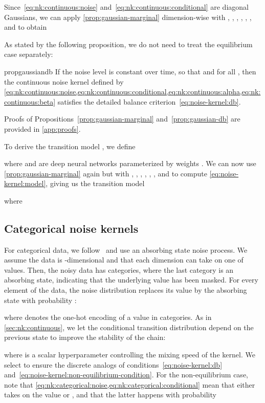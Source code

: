 \documentclass[10pt,twocolumn,letterpaper]{article}
\begin{document}
Since~\eqref{eq:nk:continuous:noise} and~\eqref{eq:nk:continuous:conditional} are diagonal Gaussians, we can apply \cref{prop:gaussian-marginal} dimension-wise with , , , , , , and  to obtain

As stated by the following proposition, we do not need to treat the equilibrium case separately:
\begin{restatable}{prop}{gaussiandb}\label{prop:gaussian-db}
  If the noise level is constant over time, so that  and  for all , then the continuous noise kernel defined by \cref*{eq:nk:continuous:noise,eq:nk:continuous:conditional,eq:nk:continuous:alpha,eq:nk:continuous:beta} satisfies the detailed balance criterion~\eqref{eq:noise-kernel:db}.
\end{restatable}

Proofs of Propositions~\ref{prop:gaussian-marginal} and~\ref{prop:gaussian-db} are provided in \cref{app:proofs}.

To derive the transition model , we define

where  and  are deep neural networks parameterized by weights .
We can now use \cref{prop:gaussian-marginal} again but with , , , , , , and  to compute \cref{eq:noise-kernel:model}, giving us the transition model

where


\subsection{Categorical noise kernels}\label{sec:nk:categorical}

For categorical data, we follow~\cite{austin2021structured} and use an absorbing state noise process.
We assume the data is -dimensional and that each dimension can take on one of  values.
Then, the noisy data has  categories, where the last category is an absorbing state, indicating that the underlying value has been masked.
For every element  of the data, the noise distribution replaces its value  by the absorbing state  with probability :

where  denotes the one-hot encoding of a value  in  categories.
As in \cref{sec:nk:continuous}, we let the conditional transition distribution depend on the previous state to improve the stability of the chain:

where  is a scalar hyperparameter controlling the mixing speed of the kernel.
We select  to ensure the discrete analogs of conditions~\eqref{eq:noise-kernel:db} and~\eqref{eq:noise-kernel:non-equilibrium-condition}.
For the non-equilibrium case, note that \cref{eq:nk:categorical:noise,eq:nk:categorical:conditional} mean that  either takes on the value  or , and that the latter happens with probability
\end{document}
